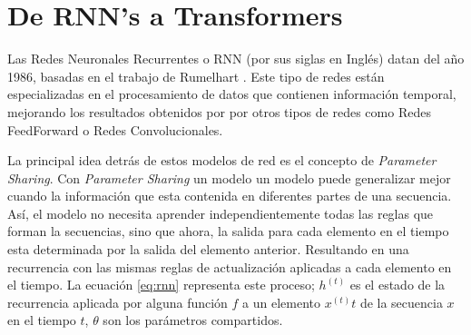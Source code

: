 \section{De RNN's a Transformers}

Las Redes Neuronales Recurrentes o RNN (por sus siglas en Inglés) datan del año 1986, basadas en el
trabajo de Rumelhart \cite{Rumelhart}. Este tipo de redes están especializadas en el procesamiento
de datos que contienen información temporal, mejorando los resultados obtenidos por por otros tipos
de redes como Redes FeedForward o Redes Convolucionales.

La principal idea detrás de estos modelos de red es el concepto de \textit{Parameter Sharing}.
Con \textit{Parameter Sharing} un modelo un modelo puede generalizar mejor cuando la información
que esta contenida en diferentes partes de una secuencia. Así, el modelo no necesita aprender
independientemente todas las reglas que forman la secuencias, sino que ahora, la salida para cada
elemento en el tiempo esta determinada por la salida del elemento anterior. Resultando en una
recurrencia con las mismas reglas de actualización aplicadas a cada elemento en el tiempo.
La ecuación \ref{eq:rnn} representa este proceso; $h^{(t)}$ es el estado de la recurrencia aplicada
por alguna función $f$ a un elemento $x^{(t)}t$ de la secuencia $x$ en el tiempo $t$, $\theta$ son
los parámetros compartidos.

